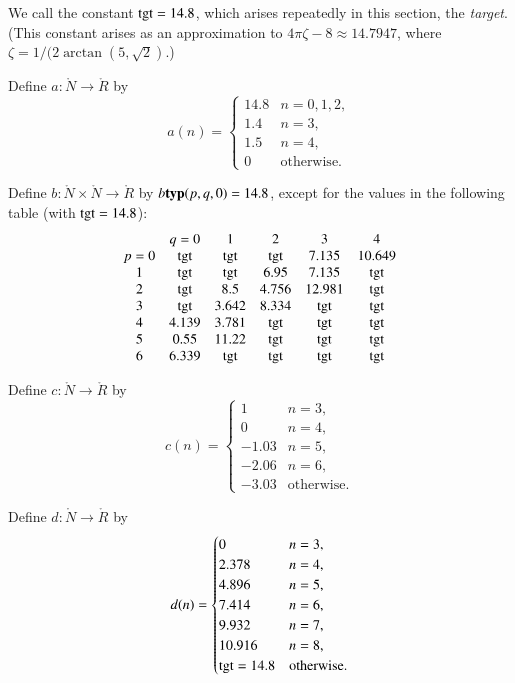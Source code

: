 We call the constant ${\operatorname{tgt}}=14.8$, which arises repeatedly in
this section, the {\it target}.  (This constant arises as an
approximation to $4\pi\zeta -8\approx 14.7947$, where $\zeta =
1/(2\arctan(5,\sqrt{2})$.)
%

\begin{definition}[a]
  Define $a:\ring{N}\to \ring{R}$ by
  $$a(n) = \begin{cases}
    14.8 &n=0,1,2,\\
    1.4 & n=3,\\
    1.5 & n=4,\\
    0 & \text{otherwise.}
  \end{cases}
  $$
\end{definition}

\begin{definition}[b]
  Define $b:\ring{N}\times \ring{N}\to \ring{R}$ by $b{\operatorname{\bf typ}}{(p,q,0)}=14.8$,
  except for the values in the following table
  (with  ${\operatorname{tgt}}=14.8$):
  {
  \def\tx{\op{tgt}}
  $$\begin{matrix}  &q=0&1&2&3&4\\
           p=0&\tx&\tx&\tx&7.135&10.649\\
           1&\tx&\tx&6.95&7.135&\tx\\
           2&\tx&8.5&4.756&12.981&\tx\\
           3&\tx&3.642&8.334&\tx&\tx\\
           4&4.139&3.781&\tx&\tx&\tx\\
           5&0.55&11.22&\tx&\tx&\tx\\
           6&6.339&\tx&\tx&\tx&\tx
   \end{matrix}
   $$
   }
\end{definition}

\begin{definition}[c]
  Define $c:\ring{N}\to \ring{R}$ by
  $$c(n) = \begin{cases}
    1 & n=3,\\
    0 & n=4,\\
    -1.03 &n=5,\\
    -2.06 &n=6,\\
    -3.03 &\text{otherwise.}
    \end{cases}
    $$
\end{definition}

\begin{definition}[d]
    Define $d:\ring{N}\to \ring{R}$ by
  $$d(n) = \begin{cases}
    0 & n=3, \\
    2.378 & n=4, \\
    4.896 & n=5, \\
    7.414 & n=6, \\
    9.932 & n=7, \\
    10.916 & n=8,\\
    {\operatorname{tgt}}=14.8 & \text{otherwise}.
  \end{cases}
  $$
\end{definition}

